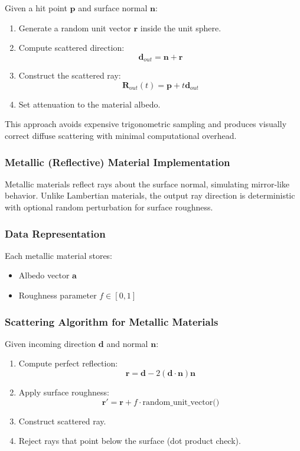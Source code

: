 \documentclass[11pt]{article}
\begin{document}
Given a hit point $\mathbf{p}$ and surface normal $\mathbf{n}$:
\begin{enumerate}
    \item Generate a random unit vector $\mathbf{r}$ inside the unit sphere.
    \item Compute scattered direction:
    \[
    \mathbf{d}_{out} = \mathbf{n} + \mathbf{r}
    \]
    \item Construct the scattered ray:
    \[
    \mathbf{R}_{out}(t) = \mathbf{p} + t\mathbf{d}_{out}
    \]
    \item Set attenuation to the material albedo.
\end{enumerate}

This approach avoids expensive trigonometric sampling and produces visually correct diffuse scattering with minimal computational overhead.

\subsubsection{Metallic (Reflective) Material Implementation}

Metallic materials reflect rays about the surface normal, simulating mirror-like behavior. Unlike Lambertian materials, the output ray direction is deterministic with optional random perturbation for surface roughness.

\subsubsection{Data Representation}

Each metallic material stores:
\begin{itemize}
    \item Albedo vector $\mathbf{a}$
    \item Roughness parameter $f \in [0,1]$
\end{itemize}

\subsubsection{Scattering Algorithm for Metallic Materials}

Given incoming direction $\mathbf{d}$ and normal $\mathbf{n}$:
\begin{enumerate}
    \item Compute perfect reflection:
    \[
    \mathbf{r} = \mathbf{d} - 2(\mathbf{d} \cdot \mathbf{n})\mathbf{n}
    \]
    \item Apply surface roughness:
    \[
    \mathbf{r}' = \mathbf{r} + f \cdot \text{random\_unit\_vector()}
    \]
    \item Construct scattered ray.
    \item Reject rays that point below the surface (dot product check).
\end{enumerate}
\end{document}

